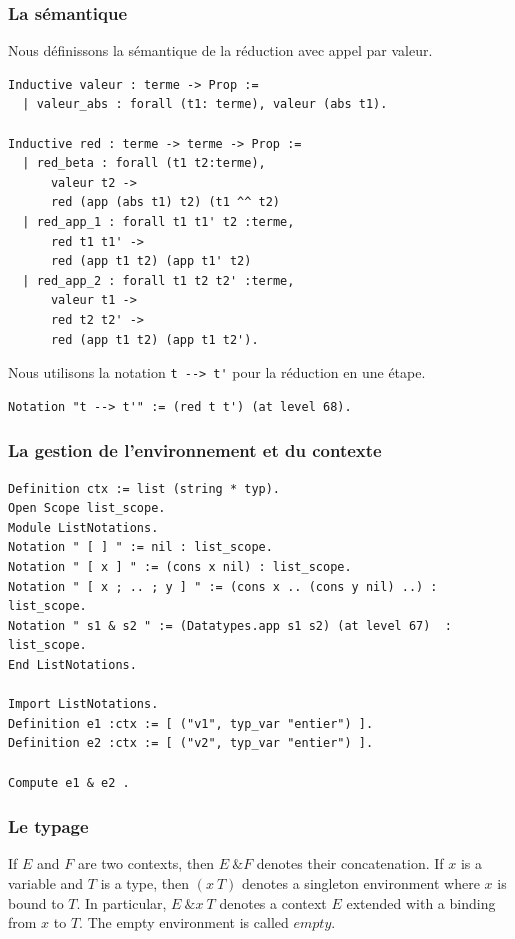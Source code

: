 \documentclass[11pt]{book}
\begin{document}
\subsubsection{La sémantique} 
Nous définissons la sémantique de la réduction avec appel par valeur.

\begin{Verbatim}
Inductive valeur : terme -> Prop :=
  | valeur_abs : forall (t1: terme), valeur (abs t1).

Inductive red : terme -> terme -> Prop :=
  | red_beta : forall (t1 t2:terme),
      valeur t2 ->
      red (app (abs t1) t2) (t1 ^^ t2)
  | red_app_1 : forall t1 t1' t2 :terme,
      red t1 t1' ->
      red (app t1 t2) (app t1' t2)
  | red_app_2 : forall t1 t2 t2' :terme,
      valeur t1 ->
      red t2 t2' ->
      red (app t1 t2) (app t1 t2').

\end{Verbatim}
Nous utilisons la notation \verb+t --> t'+ pour la réduction en une étape.

\begin{Verbatim}
Notation "t --> t'" := (red t t') (at level 68).
\end{Verbatim}

\subsubsection{La gestion de l'environnement et du contexte}
    
\begin{Verbatim}
Definition ctx := list (string * typ).
Open Scope list_scope.
Module ListNotations.
Notation " [ ] " := nil : list_scope.
Notation " [ x ] " := (cons x nil) : list_scope.
Notation " [ x ; .. ; y ] " := (cons x .. (cons y nil) ..) : list_scope.
Notation " s1 & s2 " := (Datatypes.app s1 s2) (at level 67)  : list_scope.
End ListNotations.

Import ListNotations.
Definition e1 :ctx := [ ("v1", typ_var "entier") ].
Definition e2 :ctx := [ ("v2", typ_var "entier") ].

Compute e1 & e2 .
\end{Verbatim}

\subsubsection{Le typage} 

 If $E$ and $F$ are two contexts, then $E\ \& F$ denotes their 
    concatenation. If $x$ is a variable and $T$ is a type, then 
    $(x ~ T)$ denotes a singleton environment where $x$ is bound to $T$.
    In particular, $E\ \& x ~ T$ denotes a context $E$ extended 
    with a binding from $x$ to $T$. The empty environment is 
    called $empty$.
\end{document}
